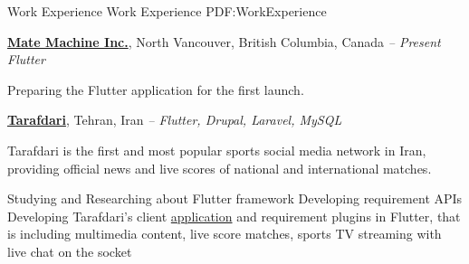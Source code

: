 \documentclass[letterpaper,MMMyyyy,nonstopmode]{simpleresumecv}
\begin{document}
\begin{Body}


\Section
{Work\newline
Experience}
{Work Experience}
{PDF:WorkExperience}

\Entry
\href{https://matemachine.com}
{\textbf{Mate Machine Inc.}},
\small{North Vancouver, British Columbia, Canada}
\hfill
\textsl{\small{ -- Present}}
\Gap
\small{\textit{Flutter}}

\Gap
\BulletItem
Preparing the Flutter application for the first launch.

\Entry
\href{https://tarafdari.com}
{\textbf{Tarafdari}},
\small{Tehran, Iran}
\hfill
\textsl{\small{ -- }}
\Gap
\small{\textit{Flutter, Drupal, Laravel, MySQL}}

\Gap
\BulletItem
Tarafdari is the first and most popular sports social media network
in Iran, providing official news and live scores of national and international matches.
\begin{Detail}
\SubBulletItem
Studying and Researching about Flutter framework
\SubBulletItem
Developing requirement APIs
\SubBulletItem
Developing Tarafdari's client
\href{https://play.google.com/store/apps/details?id=com.tarafdari.news}
{application}
and requirement plugins in Flutter, that is including multimedia content,
live score matches, sports TV streaming with live chat on the socket
\end{Detail}






\end{Body}
\end{document}
